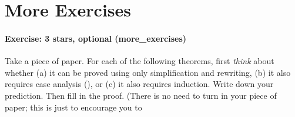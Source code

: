 \documentclass[12pt]{report}
\begin{document}
\section{More Exercises}



\paragraph{Exercise: 3 stars, optional (more\_exercises)}

 Take a piece of paper.  For each of the following theorems, first
    \textit{think} about whether (a) it can be proved using only
    simplification and rewriting, (b) it also requires case
    analysis (), or (c) it also requires induction.  Write
    down your prediction.  Then fill in the proof.  (There is no need
    to turn in your piece of paper; this is just to encourage you to
\end{document}
